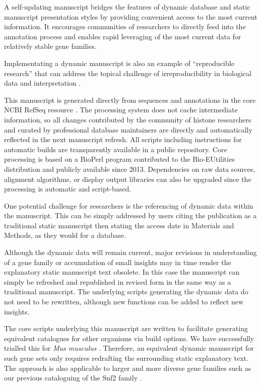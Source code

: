   A self-updating manuscript bridges the features of dynamic database and static manuscript
  presentation styles by providing convenient access to the most current information.
  It encourages communities of researchers to directly feed into the annotation process
  and enables rapid leveraging of the most current data for relatively stable gene families.

  Implementating a dynamic manuscript is also an example of ``reproducible research''
  \citep{reproducible-research-bioinformatics,reproducible-research-law}
  that can address the topical challenge of irreproducibility in biological data
  and interpretation \citep{ErrorProne2012,ince2012case}.

  This manuscript is generated directly from sequences and annotations
  in the core NCBI RefSeq resource \citep{OLearyRefseq2016}.
  The processing system does not cache intermediate information,
  so all changes contributed by the community of histone researchers
  and curated by professional database maintainers
  are directly and automatically reflected in the next manuscript refresh.
  All scripts including instructions for automatic builds
  are transparently available in a public repository.
  Core processing is based on a BioPerl program contributed to the Bio-EUtilities distribution
  and publicly available since 2013.
  Dependencies on raw data sources, alignment algorithms, or display output libraries
  can also be upgraded since the processing is automatic and script-based.

  One potential challenge for researchers is the referencing of dynamic data within the manuscript.
  This can be simply addressed by users citing the publication as a traditional static manuscript
  then stating the access date in Materials and Methods, as they would for a database.

  Although the dynamic data will remain current,
  major revisions in understanding of a gene family or accumulation of small insights
  may in time render the explanatory static manuscript text obsolete.
  In this case the manuscript can simply be refreshed and republished in revised form
  in the same way as a traditional manuscript.
  The underlying scripts generating the dynamic data do not need to be rewritten,
  although new functions can be added to reflect new insights.

  The core scripts underlying this manuscript are written to facilitate generating
  equivalent catalogues for other organisms via build options.
  We have successfully trialled this for
  \textit{Mus musculus} .
  Therefore, an equivalent dynamic manuscript for such gene sets
  only requires redrafting the surrounding static explanatory text.
  The approach is also applicable to larger and more diverse gene families such as
  our previous cataloguing of the Snf2 family \citep{andrew-snf2-catalogue}.

